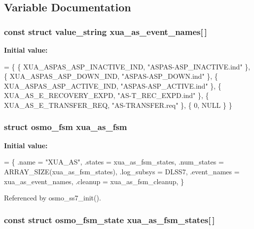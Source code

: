 \subsection{Variable Documentation}
\subsubsection[{xua\+\_\+as\+\_\+event\+\_\+names}]{\setlength{\rightskip}{0pt plus 5cm}const struct value\+\_\+string xua\+\_\+as\+\_\+event\+\_\+names[$\,$]\hspace{0.3cm}{\ttfamily [static]}}\label{xua__as__fsm_8c_a307e97238e981dbc91bf5f16aa4398c5}
{\bfseries Initial value\+:}
\begin{DoxyCode}
= \{
        \{ XUA_ASPAS_ASP_INACTIVE_IND,   \textcolor{stringliteral}{"ASPAS-ASP\_INACTIVE.ind"} \},
        \{ XUA_ASPAS_ASP_DOWN_IND,       \textcolor{stringliteral}{"ASPAS-ASP\_DOWN.ind"} \},
        \{ XUA_ASPAS_ASP_ACTIVE_IND,     \textcolor{stringliteral}{"ASPAS-ASP\_ACTIVE.ind"} \},
        \{ XUA_AS_E_RECOVERY_EXPD,       \textcolor{stringliteral}{"AS-T\_REC\_EXPD.ind"} \},
        \{ XUA_AS_E_TRANSFER_REQ,        \textcolor{stringliteral}{"AS-TRANSFER.req"} \},
        \{ 0, NULL \}
\}
\end{DoxyCode}
\subsubsection[{xua\+\_\+as\+\_\+fsm}]{\setlength{\rightskip}{0pt plus 5cm}struct osmo\+\_\+fsm xua\+\_\+as\+\_\+fsm}\label{xua__as__fsm_8c_a4dda03cd65066f53f8b4b31af8fb24b6}
{\bfseries Initial value\+:}
\begin{DoxyCode}
= \{
        .name = \textcolor{stringliteral}{"XUA\_AS"},
        .states = xua_as_fsm_states,
        .num\_states = ARRAY\_SIZE(xua_as_fsm_states),
        .log\_subsys = DLSS7,
        .event\_names = xua_as_event_names,
        .cleanup = xua_as_fsm_cleanup,
\}
\end{DoxyCode}


Referenced by osmo\+\_\+ss7\+\_\+init().

\subsubsection[{xua\+\_\+as\+\_\+fsm\+\_\+states}]{\setlength{\rightskip}{0pt plus 5cm}const struct osmo\+\_\+fsm\+\_\+state xua\+\_\+as\+\_\+fsm\+\_\+states[$\,$]\hspace{0.3cm}{\ttfamily [static]}}\label{xua__as__fsm_8c_abb8a55676973be3e55228de3069f0e80}
